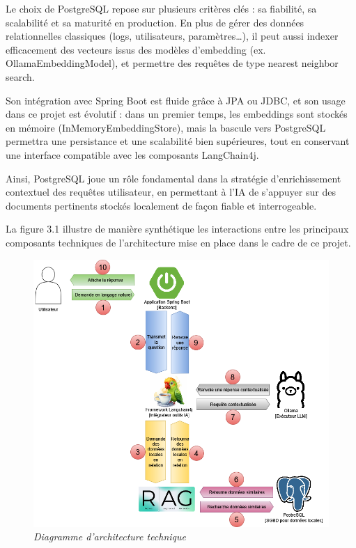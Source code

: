 \documentclass[12pt,a4paper]{report}
\begin{document}
\begin{itemize}
		Le choix de PostgreSQL repose sur plusieurs critères clés : sa fiabilité, sa scalabilité et sa maturité en production. En plus de gérer des données relationnelles classiques (logs, utilisateurs, paramètres…), il peut aussi indexer efficacement des vecteurs issus des modèles d’embedding (ex. OllamaEmbeddingModel), et permettre des requêtes de type nearest neighbor search.
		
		Son intégration avec Spring Boot est fluide grâce à JPA ou JDBC, et son usage dans ce projet est évolutif : dans un premier temps, les embeddings sont stockés en mémoire (InMemoryEmbeddingStore), mais la bascule vers PostgreSQL permettra une persistance et une scalabilité bien supérieures, tout en conservant une interface compatible avec les composants LangChain4j.
		
		Ainsi, PostgreSQL joue un rôle fondamental dans la stratégie d’enrichissement contextuel des requêtes utilisateur, en permettant à l’IA de s’appuyer sur des documents pertinents stockés localement de façon fiable et interrogeable.
		
	\end{itemize}
	
	La figure 3.1 illustre de manière synthétique les interactions entre les principaux composants techniques de l’architecture mise en place dans le cadre de ce projet.
	
	\begin{figure}[H]
		\centering
		\includegraphics[width=1\textwidth]{illustration-graphique.drawio.png}
		\caption{\textit{Diagramme d'architecture technique}}
		\label{fig:illustration-graphique}
	\end{figure}
	
\end{document}
